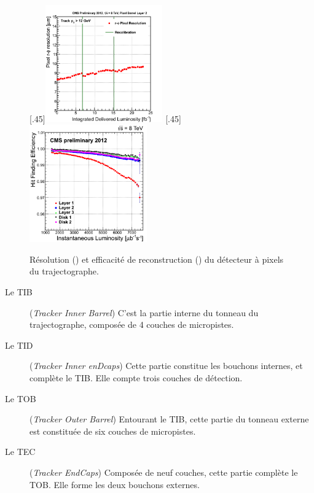 \begin{figure}[tbp] \centering
  [.45\textwidth]{\includegraphics[width=0.45\textwidth]{chapitre2/figs/pixel_detector_resolution_over_time.png}}\hfill
  [.45\textwidth]{\includegraphics[width=0.45\textwidth]{chapitre2/figs/pixel_detector_efficiency_over_time.png}}
  \caption{Résolution () et efficacité de reconstruction () du détecteur à pixels du trajectographe.}
\end{figure}

\begin{description}
  \item[Le TIB] (\emph{Tracker Inner Barrel}) C'est la partie interne du tonneau du trajectographe, composée de 4 couches de micropistes.
  \item[Le TID] (\emph{Tracker Inner enDcaps}) Cette partie constitue les bouchons internes, et complète le TIB. Elle compte trois couches de détection.
  \item[Le TOB] (\emph{Tracker Outer Barrel}) Entourant le TIB, cette partie du tonneau externe est constituée de six couches de micropistes.
  \item[Le TEC] (\emph{Tracker EndCaps}) Composée de neuf couches, cette partie complète le TOB. Elle forme les deux bouchons externes.
\end{description}

